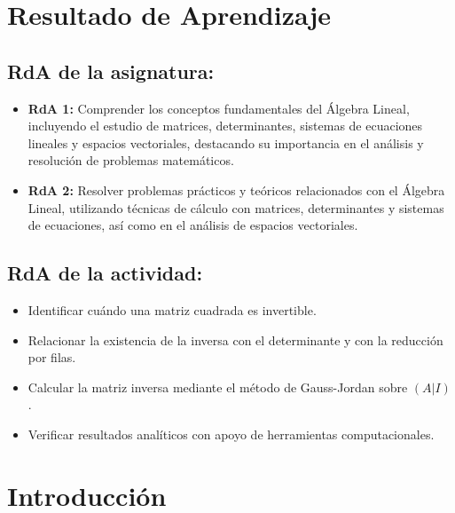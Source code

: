 \documentclass[a4,11pt]{aleph-notas}
\begin{document}
\encabezado

\section*{Resultado de Aprendizaje}

\subsection*{RdA de la asignatura:}
\begin{itemize}[leftmargin=*]
    \item \textbf{RdA 1:} Comprender los conceptos fundamentales del Álgebra Lineal, incluyendo el estudio de matrices, determinantes, sistemas de ecuaciones lineales y espacios vectoriales, destacando su importancia en el análisis y resolución de problemas matemáticos.
    \item \textbf{RdA 2:} Resolver problemas prácticos y teóricos relacionados con el Álgebra Lineal, utilizando técnicas de cálculo con matrices, determinantes y sistemas de ecuaciones, así como en el análisis de espacios vectoriales.
\end{itemize}


\subsection*{RdA de la actividad:}
\begin{itemize}[leftmargin=*]
    \item Identificar cuándo una matriz cuadrada es invertible.
    \item Relacionar la existencia de la inversa con el determinante y con la reducción por filas.
    \item Calcular la matriz inversa mediante el método de Gauss-Jordan sobre $(A|I)$.
    \item Verificar resultados analíticos con apoyo de herramientas computacionales.
\end{itemize}

\section*{Introducción}

\end{document}
